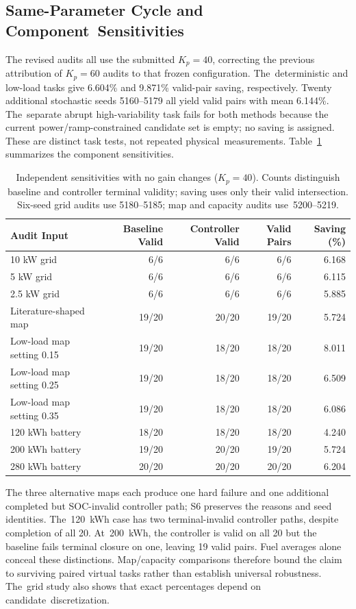\documentclass[energies,article,submit,moreauthors]{Definitions/mdpi}
\begin{document}
\subsection{Same-Parameter Cycle and Component~Sensitivities}
The revised audits all use the submitted $K_p=40$, correcting the previous attribution of $K_p=60$ audits to that frozen configuration. The~deterministic and low-load tasks give 6.604\% and 9.871\% valid-pair saving, respectively. Twenty additional stochastic seeds 5160--5179 all yield valid pairs with mean 6.144\%. The~separate abrupt high-variability task fails for both methods because the current power/ramp-constrained candidate set is empty; no saving is assigned. These are distinct task tests, not repeated physical~measurements. Table~\ref{tab:sensitivity} summarizes the component sensitivities.

\begin{table}[H]
\caption{Independent
 sensitivities with no gain changes ($K_p=40$). Counts distinguish baseline and controller terminal validity; saving uses only their valid intersection. Six-seed grid audits use 5180--5185; map and capacity audits use~5200--5219.}\label{tab:sensitivity}
\small\begin{tabularx}{\linewidth}{@{}Xrrrr@{}}\toprule
\textbf{Audit Input} & \textbf{Baseline Valid} & \textbf{Controller Valid} & \textbf{Valid Pairs} & \textbf{Saving (\%)} \\\midrule
10 kW grid & 6/6 & 6/6 & 6/6 & 6.168 \\
5 kW grid & 6/6 & 6/6 & 6/6 & 6.115 \\
2.5 kW grid & 6/6 & 6/6 & 6/6 & 5.885 \\
Literature-shaped map & 19/20 & 20/20 & 19/20 & 5.724 \\
Low-load map setting 0.15 & 19/20 & 18/20 & 18/20 & 8.011 \\
Low-load map setting 0.25 & 19/20 & 18/20 & 18/20 & 6.509 \\
Low-load map setting 0.35 & 19/20 & 18/20 & 18/20 & 6.086 \\
120 kWh battery & 18/20 & 18/20 & 18/20 & 4.240 \\
200 kWh battery & 19/20 & 20/20 & 19/20 & 5.724 \\
280 kWh battery & 20/20 & 20/20 & 20/20 & 6.204 \\\bottomrule
\end{tabularx}
\end{table}

The three alternative maps each produce one hard failure and one additional completed but SOC-invalid controller path; S6 preserves the reasons and seed identities. The~120~kWh case has two terminal-invalid controller paths, despite completion of all 20. At~200~kWh, the controller is valid on all 20 but the baseline fails terminal closure on one, leaving 19 valid pairs. Fuel averages alone conceal these distinctions. Map/capacity comparisons therefore bound the claim to surviving paired virtual tasks rather than establish universal robustness. The~grid study also shows that exact percentages depend on candidate~discretization.
\end{document}
